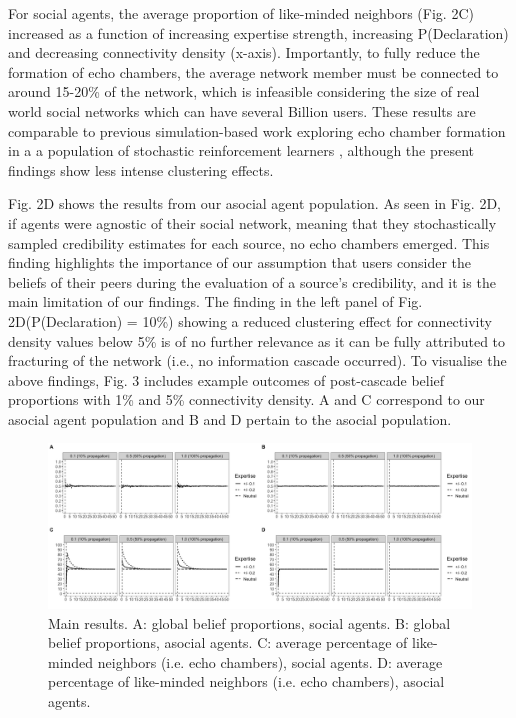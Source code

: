 \documentclass[doc,floatsintext]{apa6}
\begin{document}
For social agents, the average proportion of like-minded neighbors (Fig. 2C) increased as a function of increasing expertise strength, increasing P(Declaration) and decreasing connectivity density (x-axis). Importantly, to fully reduce the formation of echo chambers, the average network member must be connected to around 15-20\% of the network, which is infeasible considering the size of real world social networks which can have several Billion users. These results are comparable to previous simulation-based work exploring echo chamber formation in a a population of stochastic reinforcement learners \citep{pilditch2017opinion}, although the present findings show less intense clustering effects.

Fig. 2D shows the results from our asocial agent population. As seen in Fig. 2D, if agents were agnostic of their social network, meaning that they stochastically sampled credibility estimates for each source, no echo chambers emerged. This finding highlights the importance of our assumption that users consider the beliefs of their peers during the evaluation of a source's credibility, and it is the main limitation of our findings. The finding in the left panel of Fig. 2D(P(Declaration) = 10\%) showing a reduced clustering effect for connectivity density values below 5\% is of no further relevance as it can be fully attributed to fracturing of the network (i.e., no information cascade occurred). To visualise the above findings, Fig. 3 includes example outcomes of post-cascade belief proportions with 1\% and 5\% connectivity density. A and C correspond to our asocial agent population and B and D pertain to the asocial population. 


\begin{figure}[!t]
\centering
\includegraphics[width=1\columnwidth]{img/results.png}
\caption{Main results. A: global belief proportions, social agents. B: global belief proportions, asocial agents. C: average percentage of like-minded neighbors (i.e. echo chambers), social agents. D: average percentage of like-minded neighbors (i.e. echo chambers), asocial agents.} 
\label{fig:rich_vis}
\end{figure}
\end{document}
